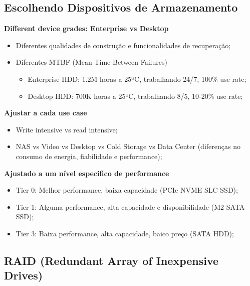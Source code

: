 \documentclass{article}
\begin{document}
\subsection{Escolhendo Dispositivos de Armazenamento}

\begin{flushleft}
  \textbf{Different device grades: Enterprise vs Desktop}
  \begin{itemize}
    \item Diferentes qualidades de construção e funcionalidades de recuperação;
    \item Diferentes MTBF (Mean Time Between Failures)
    \begin{itemize}
      \item Enterprise HDD: 1.2M horas a 25ºC, trabalhando 24/7, 100\% use rate;
      \item Desktop HDD: 700K horas a 25ºC, trabalhando 8/5, 10-20\% use rate; 
    \end{itemize}
  \end{itemize}

  \textbf{Ajustar a cada use case}
  \begin{itemize}
    \item Write intensive vs read intensive;
    \item NAS vs Video vs Desktop vs Cold Storage vs Data Center
    (diferenças no consumo de energia, fiabilidade e performance);
  \end{itemize}

  \pagebreak

  \textbf{Ajustado a um nível especifico de performance}
  \begin{itemize}
    \item Tier 0: Melhor performance, baixa capacidade (PCIe NVME SLC SSD);
    \item Tier 1: Alguma performance, alta capacidade e disponibilidade (M2 SATA SSD);
    \item Tier 3: Baixa performance, alta capacidade, baico preço (SATA HDD);
  \end{itemize}
\end{flushleft}

\subsection{RAID (Redundant Array of Inexpensive Drives)}
\end{document}
